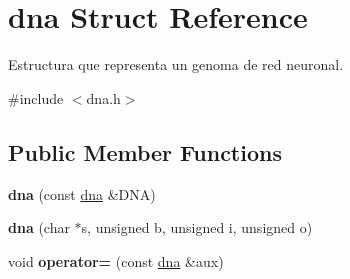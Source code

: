 \hypertarget{structdna}{}\section{dna Struct Reference}
\label{structdna}


Estructura que representa un genoma de red neuronal.  




{\ttfamily \#include $<$dna.\+h$>$}

\subsection*{Public Member Functions}
\begin{DoxyCompactItemize}
\item 
\mbox{\label{structdna_a54a35c5c7c03a95a4b2d0e1c1513ddba}} 
{\bfseries dna} (const \mbox{\hyperlink{structdna}{dna}} \&D\+NA)
\item 
\mbox{\label{structdna_a1ba2ef3fbc06a7307edb8dfa6d01187b}} 
{\bfseries dna} (char $\ast$s, unsigned b, unsigned i, unsigned o)
\item 
\mbox{\label{structdna_a07c485849dfec41e9d5a8873aaa61296}} 
void {\bfseries operator=} (const \mbox{\hyperlink{structdna}{dna}} \&aux)
\end{DoxyCompactItemize}
